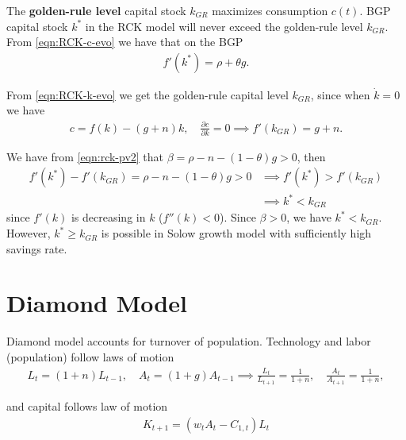 \documentclass[../main.tex]{subfiles}
\begin{document}
        The \textbf{golden-rule level} capital stock $k_{GR}$ maximizes consumption $c(t)$. BGP capital stock $k^*$ in the RCK model will never exceed the golden-rule level $k_{GR}$. \\
        
        From \eqref{eqn:RCK-c-evo} we have that on the BGP
        \begin{align}
            f'(k^*) = \rho + \theta g.
        \end{align}
        
        From \eqref{eqn:RCK-k-evo} we get the golden-rule capital level $k_{GR}$, since when $\dot k = 0$ we have
        \begin{align}
            c = f(k) - (g + n)k,
            \quad
            \frac{\partial c}{\partial k} = 0 \implies
            f'(k_{GR}) = g + n.
        \end{align}
        
        We have from \eqref{eqn:rck-pv2} that $\beta = \rho - n - (1-\theta)g > 0$, then
        \begin{align}
            f'(k^*) - f'(k_{GR}) = \rho - n - (1-\theta)g > 0
            &\implies
            f'(k^*) > f'(k_{GR})
            \\
            &\implies
            k^* < k_{GR}
        \end{align}
        since $f'(k)$ is decreasing in $k$ ($f''(k) < 0$). Since $\beta > 0$, we have $k^* < k_{GR}$. However, $k^* \ge k_{GR}$ is possible in Solow growth model with sufficiently high savings rate.
    
    
    

\chapter{Diamond Model}
        
        Diamond model accounts for turnover of population. Technology and labor (population) follow laws of motion
        \begin{align}
            L_t = (1+n) L_{t-1},
            \quad
            A_t = (1+g) A_{t-1}
            \implies
            \frac{L_t}{L_{t+1}} = \frac{1}{1+n},
            \quad\frac{A_t}{A_{t+1}} = \frac{1}{1+n},
        \end{align}
        
        and capital follows law of motion
        \begin{align}
            K_{t+1} = (w_t A_t - C_{1, t} )L_t
        \end{align}
        
\end{document}
